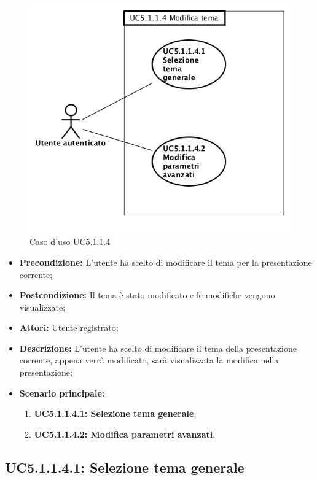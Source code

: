 \begin{figure}[h]
	\begin{center}
	\includegraphics[scale=0.4]{diagram/UC5-1-1-4.png}
	\caption{Caso d'uso UC5.1.1.4}
	\end{center}
\end{figure}
\begin{itemize}
	\item \textbf{Precondizione:} L’utente ha scelto di modificare il tema per la presentazione corrente;
	\item \textbf{Postcondizione:} Il tema è stato modificato e le modifiche vengono visualizzate;
	\item \textbf{Attori:} Utente registrato;
	\item \textbf{Descrizione:} L'utente ha scelto di modificare il tema della presentazione corrente, appena verrà modificato, sarà visualizzata la modifica nella presentazione;
	\item \textbf{Scenario principale:}
	\begin{enumerate}
		\item \textbf{ UC5.1.1.4.1: Selezione tema generale};
		\item \textbf{ UC5.1.1.4.2: Modifica parametri avanzati}.
	\end{enumerate}
\end{itemize}
\subsection{ UC5.1.1.4.1: Selezione tema generale}


